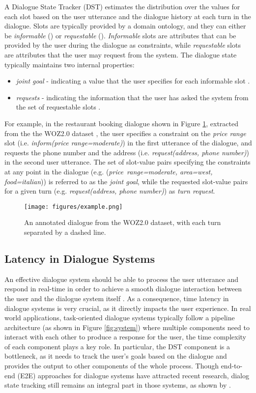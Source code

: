 \documentclass{article}
\begin{document}
A Dialogue State Tracker (DST) estimates the distribution over the values  for each slot  based on the user utterance and the dialogue history at each turn in the dialogue.
Slots  are typically provided by a domain ontology, and they can either be \textit{informable} () or \textit{requestable} ().
\textit{Informable} slots are attributes that can be provided by the user during the dialogue as constraints, while  \textit{requestable} slots are attributes that the user may request from the system.
The dialogue state typically maintains two internal properties: 
\begin{itemize}
    \item \textit{joint goal} - indicating a value  that the user specifies for each informable slot .
    \item \textit{requests} - indicating the information that the user has asked the system from the set of requestable slots .
\end{itemize}
For example, in the restaurant booking dialogue shown in Figure \ref{fig:example}, extracted from the the WOZ2.0 dataset \cite{NBT}, the user  specifies a constraint on the \textit{price range} slot (i.e. \textit{inform(price range=moderate)}) in the first utterance of the dialogue, and requests the phone number and the address (i.e. \textit{request(address, phone number)}) in the second user utterance.
The set of slot-value pairs specifying the constraints at any point in the dialogue (e.g. (\textit{price\ range=moderate, area=west, food=italian})) is referred to as the \textit{joint goal}, while the requested slot-value pairs for a given turn (e.g. \textit{request(address, phone number)}) as \textit{turn request}.

\begin{figure}
    \centering
    \texttt{[image: figures/example.png]}
    \caption{An annotated dialogue from the WOZ2.0 dataset, with each turn separated by a dashed line.}
    \label{fig:example}
\end{figure}

\subsection{Latency in Dialogue Systems}
An effective dialogue system should be able to process the user utterance and respond in real-time in order to achieve a smooth dialogue interaction between the user and the dialogue system itself \cite{nakano1999, challenges}. As a consequence, time latency in dialogue systems is very crucial, as it directly impacts the user experience.
In real world applications, task-oriented dialogue systems typically follow a pipeline architecture (as shown in Figure \ref{fig:system})
where multiple components need to interact with each other to produce a response for the user, the time complexity of each component plays a key role.
In particular, the DST component is a bottleneck, as it needs to track the user's goals based on the dialogue and provides the output to other components of the whole process.
Though end-to-end (E2E) approaches for dialogue systems have attracted recent research, dialog state tracking still remains an integral part in those systems, as shown by \cite{Liu2017, Wen2017, Li2017}.
\end{document}
